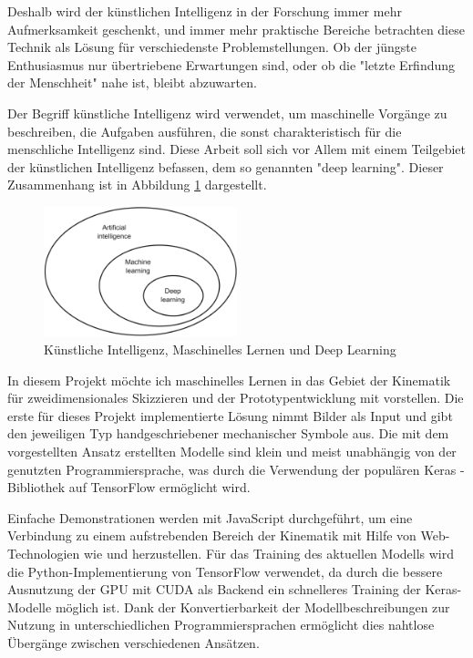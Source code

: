 Deshalb wird der künstlichen Intelligenz in der Forschung immer mehr Aufmerksamkeit geschenkt, und immer mehr praktische Bereiche betrachten diese Technik als Lösung für verschiedenste Problemstellungen.
Ob der jüngste Enthusiasmus nur übertriebene Erwartungen sind, oder ob die "letzte Erfindung der Menschheit" \cite{Good1965} nahe ist, bleibt abzuwarten.

Der Begriff künstliche Intelligenz wird verwendet, um maschinelle Vorgänge zu beschreiben, die Aufgaben ausführen, die sonst charakteristisch für die menschliche Intelligenz sind.
Diese Arbeit soll sich vor Allem mit einem Teilgebiet der künstlichen Intelligenz befassen, dem so genannten "deep learning".
Dieser Zusammenhang ist in Abbildung \ref{fig:ai_ml_dl} dargestellt.

\begin{figure}
    \includegraphics[width=0.5\textwidth]{images/ai_ml_dl.png}
    \caption{Künstliche Intelligenz, Maschinelles Lernen und Deep Learning \cite[p.4]{Chollet2017}}
    \label{fig:ai_ml_dl}
\end{figure}

In diesem Projekt möchte ich maschinelles Lernen in das Gebiet der Kinematik für zweidimensionales Skizzieren und der Prototypentwicklung mit  vorstellen.
Die erste für dieses Projekt implementierte Lösung nimmt Bilder als Input und gibt den jeweiligen Typ handgeschriebener mechanischer Symbole aus.
Die mit dem vorgestellten Ansatz erstellten Modelle sind klein und meist unabhängig von der genutzten Programmiersprache, was durch die Verwendung der populären Keras \cite{Chollet}-Bibliothek auf TensorFlow \cite{Google2019} ermöglicht wird.

Einfache Demonstrationen werden mit JavaScript durchgeführt, um eine Verbindung zu einem aufstrebenden Bereich der Kinematik mit Hilfe von Web-Technologien wie  \cite{Goessner2019} und  \cite{Uhlig2019} herzustellen.
Für das Training des aktuellen Modells wird die Python-Implementierung von TensorFlow verwendet, da durch die bessere Ausnutzung der GPU mit CUDA \cite{nvidia2019} als Backend ein schnelleres Training der Keras-Modelle möglich ist.
Dank der Konvertierbarkeit der Modellbeschreibungen zur Nutzung in unterschiedlichen Programmiersprachen ermöglicht dies nahtlose Übergänge zwischen verschiedenen Ansätzen.

